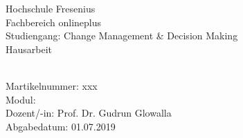 \begin{titlepage}
    \begin{center}
        \vspace*{1cm}
        \Large
        Hochschule Fresenius\\
        Fachbereich onlineplus\\
        Studiengang: Change Management \& Decision Making\\
        \vspace{2cm}
        \Large
        Hausarbeit\\
        
        \vspace{1cm}
        \Huge
        \atitle
 
        \vspace{3cm}
        \Large
        \aauthor\\
        Martikelnummer: xxx\\
        
        \vspace{1cm}
        \Large
        Modul: \amodule\\
        Dozent/-in: Prof. Dr. Gudrun Glowalla\\
        Abgabedatum: 01.07.2019\\
        
    \end{center}
\end{titlepage}
